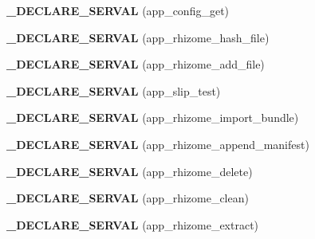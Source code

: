 \begin{DoxyCompactItemize}
\item 
\hypertarget{serval-client_8c_a1ce2db7eadecaeab827718f2fb2a66d4}{{\bfseries \+\_\+\+D\+E\+C\+L\+A\+R\+E\+\_\+\+S\+E\+R\+V\+A\+L} (app\+\_\+config\+\_\+get)}\label{serval-client_8c_a1ce2db7eadecaeab827718f2fb2a66d4}

\item 
\hypertarget{serval-client_8c_a4672c8eaed129d5f1b6005df47868ec0}{{\bfseries \+\_\+\+D\+E\+C\+L\+A\+R\+E\+\_\+\+S\+E\+R\+V\+A\+L} (app\+\_\+rhizome\+\_\+hash\+\_\+file)}\label{serval-client_8c_a4672c8eaed129d5f1b6005df47868ec0}

\item 
\hypertarget{serval-client_8c_ab9223643b41518d4087e8af485d5f922}{{\bfseries \+\_\+\+D\+E\+C\+L\+A\+R\+E\+\_\+\+S\+E\+R\+V\+A\+L} (app\+\_\+rhizome\+\_\+add\+\_\+file)}\label{serval-client_8c_ab9223643b41518d4087e8af485d5f922}

\item 
\hypertarget{serval-client_8c_a344436fe882a394053f7b6fc8e0cddd6}{{\bfseries \+\_\+\+D\+E\+C\+L\+A\+R\+E\+\_\+\+S\+E\+R\+V\+A\+L} (app\+\_\+slip\+\_\+test)}\label{serval-client_8c_a344436fe882a394053f7b6fc8e0cddd6}

\item 
\hypertarget{serval-client_8c_a417c19cf6452ab422d43d360828b43a5}{{\bfseries \+\_\+\+D\+E\+C\+L\+A\+R\+E\+\_\+\+S\+E\+R\+V\+A\+L} (app\+\_\+rhizome\+\_\+import\+\_\+bundle)}\label{serval-client_8c_a417c19cf6452ab422d43d360828b43a5}

\item 
\hypertarget{serval-client_8c_a59f5e765871538469a96868620d23b4c}{{\bfseries \+\_\+\+D\+E\+C\+L\+A\+R\+E\+\_\+\+S\+E\+R\+V\+A\+L} (app\+\_\+rhizome\+\_\+append\+\_\+manifest)}\label{serval-client_8c_a59f5e765871538469a96868620d23b4c}

\item 
\hypertarget{serval-client_8c_a85a606635134a478583d734266a91c47}{{\bfseries \+\_\+\+D\+E\+C\+L\+A\+R\+E\+\_\+\+S\+E\+R\+V\+A\+L} (app\+\_\+rhizome\+\_\+delete)}\label{serval-client_8c_a85a606635134a478583d734266a91c47}

\item 
\hypertarget{serval-client_8c_a037e8f3471691367ee34c55a1beb3c05}{{\bfseries \+\_\+\+D\+E\+C\+L\+A\+R\+E\+\_\+\+S\+E\+R\+V\+A\+L} (app\+\_\+rhizome\+\_\+clean)}\label{serval-client_8c_a037e8f3471691367ee34c55a1beb3c05}

\item 
\hypertarget{serval-client_8c_aecd3364bf7d9d5955e4ee3abf38d1dad}{{\bfseries \+\_\+\+D\+E\+C\+L\+A\+R\+E\+\_\+\+S\+E\+R\+V\+A\+L} (app\+\_\+rhizome\+\_\+extract)}\label{serval-client_8c_aecd3364bf7d9d5955e4ee3abf38d1dad}


\end{DoxyCompactItemize}
